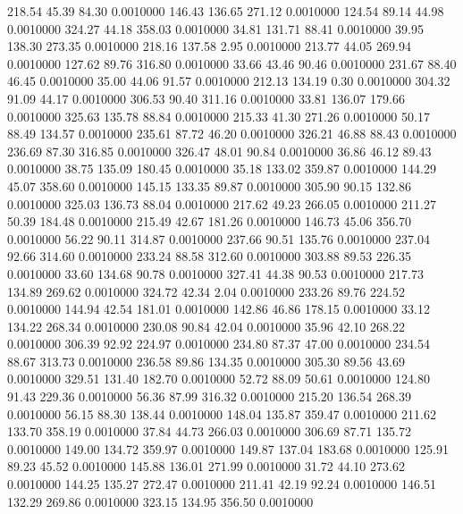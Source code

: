 218.54   45.39   84.30   0.0010000
 146.43  136.65  271.12   0.0010000
 124.54   89.14   44.98   0.0010000
 324.27   44.18  358.03   0.0010000
  34.81  131.71   88.41   0.0010000
  39.95  138.30  273.35   0.0010000
 218.16  137.58    2.95   0.0010000
 213.77   44.05  269.94   0.0010000
 127.62   89.76  316.80   0.0010000
  33.66   43.46   90.46   0.0010000
 231.67   88.40   46.45   0.0010000
  35.00   44.06   91.57   0.0010000
 212.13  134.19    0.30   0.0010000
 304.32   91.09   44.17   0.0010000
 306.53   90.40  311.16   0.0010000
  33.81  136.07  179.66   0.0010000
 325.63  135.78   88.84   0.0010000
 215.33   41.30  271.26   0.0010000
  50.17   88.49  134.57   0.0010000
 235.61   87.72   46.20   0.0010000
 326.21   46.88   88.43   0.0010000
 236.69   87.30  316.85   0.0010000
 326.47   48.01   90.84   0.0010000
  36.86   46.12   89.43   0.0010000
  38.75  135.09  180.45   0.0010000
  35.18  133.02  359.87   0.0010000
 144.29   45.07  358.60   0.0010000
 145.15  133.35   89.87   0.0010000
 305.90   90.15  132.86   0.0010000
 325.03  136.73   88.04   0.0010000
 217.62   49.23  266.05   0.0010000
 211.27   50.39  184.48   0.0010000
 215.49   42.67  181.26   0.0010000
 146.73   45.06  356.70   0.0010000
  56.22   90.11  314.87   0.0010000
 237.66   90.51  135.76   0.0010000
 237.04   92.66  314.60   0.0010000
 233.24   88.58  312.60   0.0010000
 303.88   89.53  226.35   0.0010000
  33.60  134.68   90.78   0.0010000
 327.41   44.38   90.53   0.0010000
 217.73  134.89  269.62   0.0010000
 324.72   42.34    2.04   0.0010000
 233.26   89.76  224.52   0.0010000
 144.94   42.54  181.01   0.0010000
 142.86   46.86  178.15   0.0010000
  33.12  134.22  268.34   0.0010000
 230.08   90.84   42.04   0.0010000
  35.96   42.10  268.22   0.0010000
 306.39   92.92  224.97   0.0010000
 234.80   87.37   47.00   0.0010000
 234.54   88.67  313.73   0.0010000
 236.58   89.86  134.35   0.0010000
 305.30   89.56   43.69   0.0010000
 329.51  131.40  182.70   0.0010000
  52.72   88.09   50.61   0.0010000
 124.80   91.43  229.36   0.0010000
  56.36   87.99  316.32   0.0010000
 215.20  136.54  268.39   0.0010000
  56.15   88.30  138.44   0.0010000
 148.04  135.87  359.47   0.0010000
 211.62  133.70  358.19   0.0010000
  37.84   44.73  266.03   0.0010000
 306.69   87.71  135.72   0.0010000
 149.00  134.72  359.97   0.0010000
 149.87  137.04  183.68   0.0010000
 125.91   89.23   45.52   0.0010000
 145.88  136.01  271.99   0.0010000
  31.72   44.10  273.62   0.0010000
 144.25  135.27  272.47   0.0010000
 211.41   42.19   92.24   0.0010000
 146.51  132.29  269.86   0.0010000
 323.15  134.95  356.50   0.0010000
